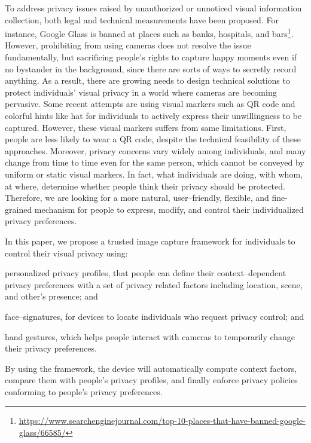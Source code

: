 To address privacy issues raised by unauthorized or unnoticed visual information collection, both legal and technical measurements have been proposed.
For instance, Google Glass is banned at places such as banks, hospitals, and bars\footnote{\url{https://www.searchenginejournal.com/top-10-places-that-have-banned-google-glass/66585/}}.
However, prohibiting from using cameras does not resolve the issue fundamentally, but sacrificing people's rights to capture happy moments even if no bystander in the background, since there are sorts of ways to secretly record anything.
As a result, there are growing needs to design technical solutions to protect individuals' visual privacy in a world where cameras are becoming pervasive.
Some recent attempts are using visual markers such as QR code \cite{bo2014privacy, roesner2014world} and colorful hints like hat \cite{schiff2009respectful} for individuals to actively express their unwillingness to be captured.
However, these visual markers suffers from same limitations.
First, people are less likely to wear a QR code, despite the technical feasibility of these approaches.
Moreover, privacy concerns vary widely among individuals, and many change from time to time even for the same person, which cannot be conveyed by uniform or static visual markers.
In fact, what individuals are doing, with whom, at where, determine whether people think their privacy should be protected.
Therefore, we are looking for a more natural, user--friendly, flexible, and fine-grained mechanism for people to express, modify, and control their individualized privacy preferences.

In this paper, we propose a trusted image capture framework for individuals to control their visual privacy using:
\begin{inparaenum}
\item personalized privacy profiles, that people can define their context--dependent privacy preferences with a set of privacy related factors including location, scene, and other's presence; and
\item face--signatures, for devices to locate individuals who request privacy control; and
\item hand gestures, which helps people interact with cameras to temporarily change their privacy preferences.
\end{inparaenum}
By using the framework, the device will automatically compute context factors, compare them with people's privacy profiles, and finally enforce privacy policies conforming to people's privacy preferences.

